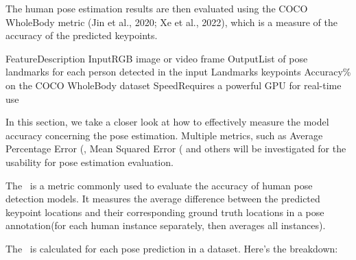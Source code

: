 The human pose estimation results are then evaluated using the COCO WholeBody metric (\scc Jin et al., 2020; \scc Xe et al., 2022), which is a measure of the accuracy of the predicted keypoints.

    \setupTABLE[r][1][style=bold]
    \setupTABLE[c][each][offset=3dd]
    \setupTABLE[frame=off]
    \setupTABLE[r][1][topframe=on,bottomframe=on]
    \setupTABLE[c][each][leftframe=on]
    \setupTABLE[c][1][leftframe=off]
    \bTR
        \bTD Feature\eTD\bTD    Description\eTD\eTR
    \bTR
        \bTD Input\eTD\bTD      RGB image or video frame\eTD\eTR
    \bTR
        \bTD Output\eTD\bTD     List of pose landmarks for each person detected in the input\eTD\eTR
    \bTR
        \bTD Landmarks\eTD{} keypoints\eTD\eTR
    \bTR
        \bTD Accuracy\eTD{}\% on the COCO WholeBody dataset\eTD\eTR
    \bTR
        \bTD Speed\eTD\bTD      Requires a powerful GPU for real-time use\eTD\eTR


In this section, we take a closer look at how to effectively measure the model accuracy concerning the pose estimation. Multiple metrics, such as Average Percentage Error (\APE\), Mean Squared Error (\MSE\) and others will be investigated for the usability for pose estimation evaluation.

The \APE\ is a metric commonly used to evaluate the accuracy of human pose detection models. It measures the average difference between the predicted keypoint locations and their corresponding ground truth locations in a pose annotation(for each human instance separately, then averages all instances).

The \APE\ is calculated for each pose prediction in a dataset. Here's the breakdown:

